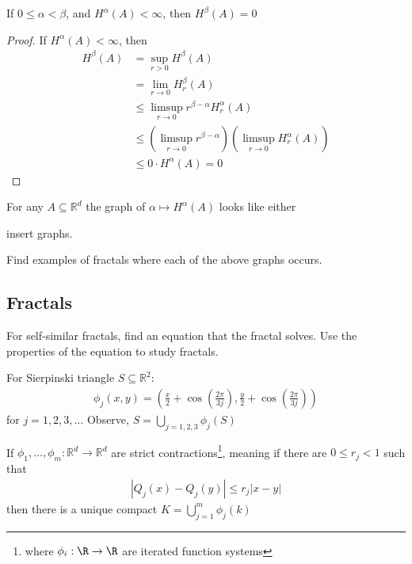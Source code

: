 \begin{lemma}
If $0 \leq \alpha < \beta$, and $H^{\alpha}(A) < \infty$, then $H^{\beta} (A) = 0$
\end{lemma}

\begin{proof}
	If $H^{\alpha}(A) < \infty$, then
	\begin{align*}
		H^{\beta} (A) &= \sup_{r > 0} H^{\beta} (A) \\
					  &= \lim_{r \to 0} H_{r}^{\beta} (A) \\
					  &\leq \limsup_{r \to 0} r^{\beta - \alpha} H_{r}^{\alpha} (A) \\
					  &\leq \left( \limsup_{r \to 0} r^{\beta - \alpha} \right) \left( \limsup_{r \to 0} H_{r}^{\alpha} (A) \right) \\
					  &\leq 0 \cdot H^{\alpha} (A) = 0
	\end{align*}
\end{proof}

For any $A \subseteq \mathbb{R}^d$ the graph of $\alpha \mapsto H^{\alpha} (A)$ looks like either 

insert graphs.

\begin{exercise}
	Find examples of fractals where each of the above graphs occurs.
\end{exercise}

\subsection{Fractals}

For self-similar fractals, find an equation that the fractal solves. Use the properties of the equation to study fractals.

\begin{example}
	For Sierpinski triangle $S \subseteq \mathbb{R}^2$:
	\begin{align*}
		\phi_{j} (x, y) = \left(\frac{x}{2} + \cos\left(\frac{2 \pi}{3 j}\right), \frac{y}{2} + \cos\left(\frac{2 \pi}{3 j}\right) \right)
	\end{align*} for $j = 1,2,3, \ldots$ Observe,
	$S = \bigcup_{j = 1,2,3} \phi_j (S) $
\end{example}

\begin{theorem}
	If $\phi_{1}, \ldots, \phi_{m} : \mathbb{R}^d \to \mathbb{R}^d$ are strict contractions\footnote{where $\phi_i : \R \to \R$ are iterated function systems}, meaning if there are $0 \leq r_{j} < 1$ such that
	\begin{align*}
		| Q_j (x) - Q_j (y) | \leq r_{j} |x - y |
	\end{align*} then there is a unique compact
	$K = \bigcup_{j=1}^{m} \phi_{j} (k)$
\end{theorem}

